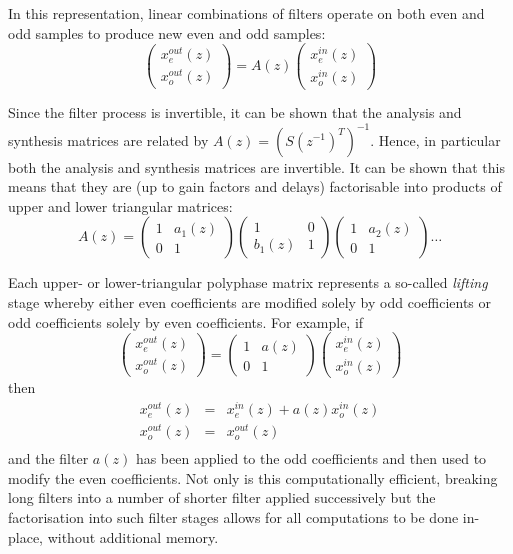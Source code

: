 \begin{informative*}
In this representation, linear combinations of filters operate on both even and 
odd samples to produce new even and odd samples:
\[
\left( 
\begin{array}{c}
x^{out}_e(z) \\
x^{out}_o(z)
\end{array}
\right) 
= A(z)
\left(
\begin{array}{c}
x^{in}_e(z) \\
x^{in}_o(z)
\end{array}
\right)
\]

Since the filter process is invertible, it can be shown that the analysis and 
synthesis matrices are related by $A(z)=(S(z^{-1})^T)^{-1}$. Hence, in particular
both the analysis and synthesis matrices are invertible. It can be shown that
this means that they are (up to gain factors and delays) factorisable into 
products of upper and lower triangular matrices:
\[A(z)= 
\left(
\begin{array}{cc}
1 & a_1(z) \\
0 & 1
\end{array}
\right)
\left(
\begin{array}{cc}
1 & 0 \\
b_1(z) & 1
\end{array}
\right)
\left(
\begin{array}{cc}
1 & a_2(z) \\
0 & 1
\end{array}
\right)
\ldots
\]

Each upper- or lower-triangular polyphase matrix represents a so-called {\em lifting} stage
whereby either even coefficients are modified solely by odd coefficients or odd coefficients
solely by even coefficients. For example, if 
\[
\left( 
\begin{array}{c}
x^{out}_e(z) \\
x^{out}_o(z)
\end{array}
\right) 
=
\left(
\begin{array}{cc}
1 & a(z) \\
0 & 1
\end{array}
\right)
\left(
\begin{array}{c}
x^{in}_e(z) \\
x^{in}_o(z)
\end{array}
\right) 
\]
then
\begin{eqnarray*}
x^{out}_e(z) & = & x^{in}_e(z) + a(z)x^{in}_o(z) \\
x^{out}_o(z) & = & x^{out}_o(z)\\
\end{eqnarray*}
and the filter $a(z)$ has been applied to the odd coefficients and then used to modify
the even coefficients. Not only is this computationally efficient, breaking long
filters into a number of shorter filter applied successively but the
factorisation into such filter stages allows for all computations to be done in-place,
without additional memory.
 \end{informative*}